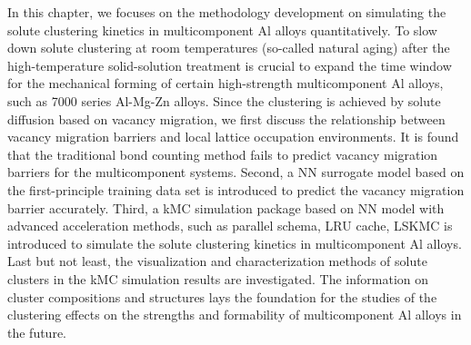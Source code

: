 In this chapter, we focuses on the methodology development on simulating the solute clustering kinetics in multicomponent Al alloys quantitatively. To slow down solute clustering at room temperatures (so-called natural aging) after the high-temperature solid-solution treatment is crucial to expand the time window for the mechanical forming of certain high-strength multicomponent Al alloys, such as 7000 series Al-Mg-Zn alloys. Since the clustering is achieved by solute diffusion based on vacancy migration, we first discuss the relationship between vacancy migration barriers and local lattice occupation environments. It is found that the traditional bond counting method fails to predict vacancy migration barriers for the multicomponent systems. Second, a \acf{NN} surrogate model based on the first-principle training data set is introduced to predict the vacancy migration barrier accurately. Third, a \acf{kMC} simulation package based on \ac{NN} model with advanced acceleration methods, such as parallel schema, \acf{LRU} cache, \acf{LSKMC} is introduced to simulate the solute clustering kinetics in multicomponent Al alloys. Last but not least, the visualization and characterization methods of solute clusters in the kMC simulation results are investigated. The information on cluster compositions and structures lays the foundation for the studies of the clustering effects on the strengths and formability of multicomponent Al alloys in the future.





